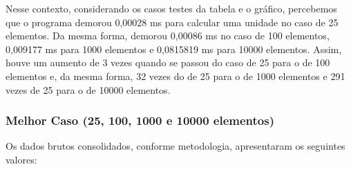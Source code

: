 \documentclass[a4paper, 12pt]{article}
\begin{document}
Nesse contexto, considerando os casos testes da tabela e o gráfico, percebemos que o programa demorou 0,00028 ms para calcular uma unidade no caso de 25 elementos. Da mesma forma, demorou 0,00086 ms no caso de 100 elementos, 0,009177 ms para 1000 elementos e 0,0815819 ms para 10000 elementos. Assim, houve um aumento de 3 vezes quando se passou do caso de 25 para o de 100 elementos e, da mesma forma, 32 vezes do de 25 para o de 1000 elementos e 291 vezes de 25 para o de 10000 elementos.


\subsubsection{Melhor Caso (25, 100, 1000 e 10000 elementos)}

\tab{ }Os dados brutos consolidados, conforme metodologia, apresentaram os seguintes valores:
\vspace{0.2cm}
\end{document}
